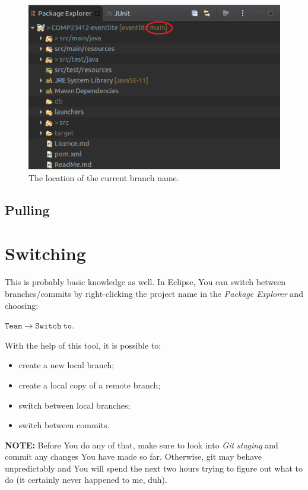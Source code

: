 \documentclass{article}
\begin{document}
\begin{figure}[h]
    \centering
    \includegraphics[scale=0.6]{branch_name.png}
    \caption{The location of the current branch name.}
    \label{fig:branch_name}
\end{figure}

\subsection{Pulling}
\label{sec:pulling}

\section{Switching}
\label{sec:switching}

This is probably basic knowledge as well. In Eclipse, You can switch between branches/commits by right-clicking the project name in the \textit{Package Explorer} and choosing:\newline

$\mathtt{Team \rightarrow Switch\ to}$.\newline

With the help of this tool, it is possible to:

\begin{itemize}
    \item create a new local branch;
    \item create a local copy of a remote branch;
    \item switch between local branches;
    \item switch between commits.
\end{itemize}

\textbf{NOTE: } Before You do any of that, make sure to look into \textit{Git staging} and commit any changes You have made so far. Otherwise, git may behave unpredictably and You will spend the next two hours trying to figure out what to do (it certainly never happened to me, duh). 
\end{document}
